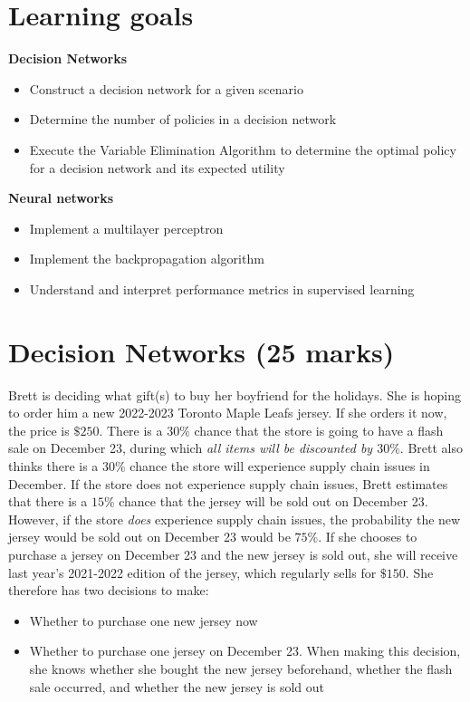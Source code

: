 \documentclass[12pt]{article}
\begin{document}
\section*{Learning goals}

{\bf Decision Networks}
\begin{itemize}
\item
Construct a decision network for a given scenario
\item
Determine the number of policies in a decision network
\item
Execute the Variable Elimination Algorithm to determine the optimal policy for a decision network and its expected utility
\end{itemize}

{\bf Neural networks}
\begin{itemize}
\item
Implement a multilayer perceptron
\item
Implement the backpropagation algorithm
\item 
Understand and interpret performance metrics in supervised learning
\end{itemize}

\newpage

\section{Decision Networks (25 marks)}

Brett is deciding what gift(s) to buy her boyfriend for the holidays. She is hoping to order him a new 2022-2023 Toronto Maple Leafs jersey. If she orders it now, the price is $\$250$. There is a $30\%$ chance that the store is going to have a flash sale on December 23, during which \textit{all items will be discounted by $\mathit{30\%}$}. Brett also thinks there is a $30\%$ chance the store will experience supply chain issues in December. If the store does not experience supply chain issues, Brett estimates that there is a $15\%$ chance that the jersey will be sold out on December 23. However, if the store {\it does} experience supply chain issues, the probability the new jersey would be sold out on December 23 would be $75\%$. If she chooses to purchase a jersey on December 23 and the new jersey is sold out, she will receive last year's 2021-2022 edition of the jersey, which regularly sells for $\$150$. She therefore has two decisions to make:
\begin{itemize}
    \item Whether to purchase one new jersey now
    \item Whether to purchase one jersey on December 23. When making this decision, she knows whether she bought the new jersey beforehand, whether the flash sale occurred, and whether the new jersey is sold out
\end{itemize}
\end{document}
